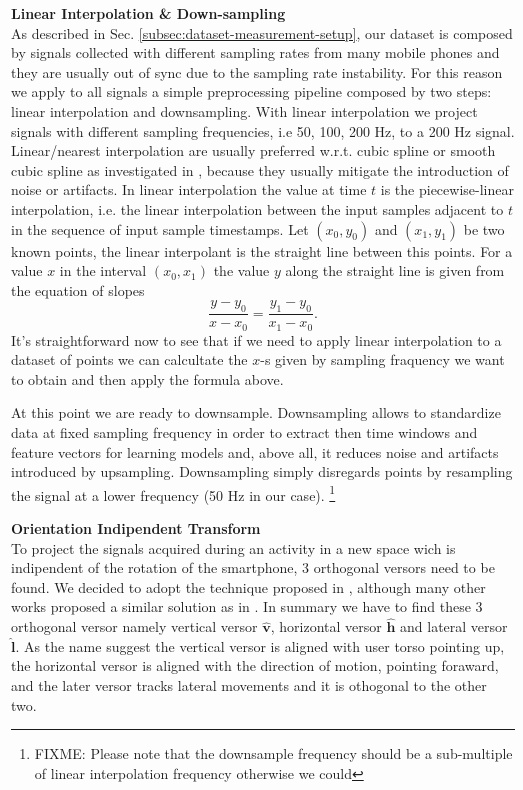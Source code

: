 \textbf{Linear Interpolation \& Down-sampling}\\

As described in Sec. \ref{subsec:dataset-measurement-setup}, our
dataset is composed by signals collected with different sampling rates
from many mobile phones and they are usually out of sync due to the
sampling rate instability. For this reason we apply to all signals a
simple preprocessing pipeline composed by two steps: linear
interpolation and downsampling. With linear interpolation we project
signals with different sampling frequencies, i.e 50, 100, 200 Hz, to a
200 Hz signal. Linear/nearest interpolation are usually preferred
w.r.t. cubic spline or smooth cubic spline as investigated in
\cite{stisen2015smart}, because they usually mitigate the introduction
of noise or artifacts. In linear interpolation the value at time $t$
is the piecewise-linear interpolation, i.e. the linear interpolation
between the input samples adjacent to $t$ in the sequence of input
sample timestamps. Let $(x_0, y_0)$ and $(x_1, y_1)$ be two known
points, the linear interpolant is the straight line between this
points. For a value $x$ in the interval $(x_0, x_1)$ the value $y$
along the straight line is given from the equation of slopes
\begin{equation}
  \label{eq:linear-interpolation}
  \frac{y - y_0}{x - x_0} = \frac{y_1 - y_0}{x_1 - x_0}.
\end{equation}
It's straightforward now to see that if we need to apply linear
interpolation to a dataset of points we can calcultate the $x$-s given
by sampling fraquency we want to obtain and then apply the formula
above.

At this point we are ready to downsample. Downsampling allows to
standardize data at fixed sampling frequency in order to extract then
time windows and feature vectors for learning models and, above all,
it reduces noise and artifacts introduced by upsampling. Downsampling
simply disregards points by resampling the signal at a lower frequency
(50 Hz in our case). \footnote{FIXME: Please note that the downsample
  frequency should be a sub-multiple of linear interpolation frequency
  otherwise we could}

\textbf{Orientation Indipendent Transform}\\
To project the signals acquired during an activity in a new space wich is indipendent of the rotation of the smartphone, 3 orthogonal versors need to be found. We decided to adopt the technique proposed in \cite{gadaleta2018idnet}, although many other works proposed a similar solution as in \cite{kunze2009way, henpraserttae2011accurate}. In summary we have to find these 3 orthogonal versor namely vertical versor $\boldsymbol{\hat{v}}$, horizontal versor $\boldsymbol{\hat{h}}$ and lateral versor $\boldsymbol{\hat{l}}$. As the name suggest the vertical versor is aligned with user torso pointing up, the horizontal versor is aligned with the direction of motion, pointing foraward, and the later versor tracks lateral movements and it is othogonal to the other two.

